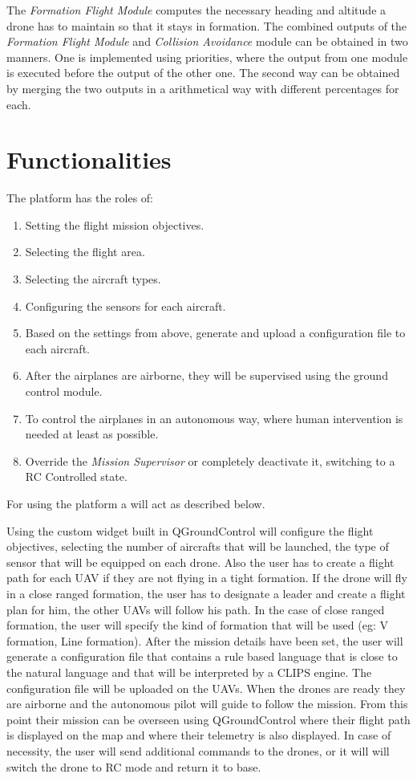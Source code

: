 The \textit{Formation Flight Module} computes the necessary heading and altitude
a drone has to maintain so that it stays in formation. The combined outputs 
of the \textit{Formation Flight Module} and \textit{Collision Avoidance} module
can be obtained in two manners. One is implemented using priorities, where the
output from one module is executed before the output of the other one. The second
way can be obtained by merging the two outputs in a arithmetical way with different
percentages for each.

\section{Functionalities}
\label{sec:functionalities}

The platform has the roles of:
\begin{enumerate}
\item Setting the flight mission objectives.
\item Selecting the flight area.
\item Selecting the aircraft types.
\item Configuring the sensors for each aircraft.
\item Based on the settings from above, generate and upload a configuration file
to each aircraft.
\item After the airplanes are airborne, they will be supervised using the 
ground control module.
\item To control the airplanes in an autonomous way, where human intervention is
needed at least as possible.
\item Override the \textit{Mission Supervisor} or completely deactivate it, 
switching to a RC Controlled state.
\end{enumerate}

For using the platform a will act as described below.

Using the custom widget built in QGroundControl will configure the flight objectives, 
selecting the number of aircrafts that will be launched, the type of sensor that
will be equipped on each drone. Also the user has to create a flight path for 
each UAV if they are not flying in a tight formation. If the drone will fly in 
a close ranged formation, the user has to designate a leader and create a flight
plan for him, the other UAVs will follow his path. In the case of close ranged 
formation, the user will specify the kind of formation that will be used (eg: 
  V formation, Line formation). After the mission details have been set, the user
will generate a configuration file that contains a rule based language that
is close to the natural language and that will be interpreted by a CLIPS engine.
The configuration file will be uploaded on the UAVs. When the drones are ready
they are airborne and the autonomous pilot will guide to follow the mission.
From this point their mission can be overseen using QGroundControl where their
flight path is displayed on the map and where their telemetry is also displayed.
In case of necessity, the user will send additional commands to the drones, or
it will will switch the drone to RC mode and return it to base.

